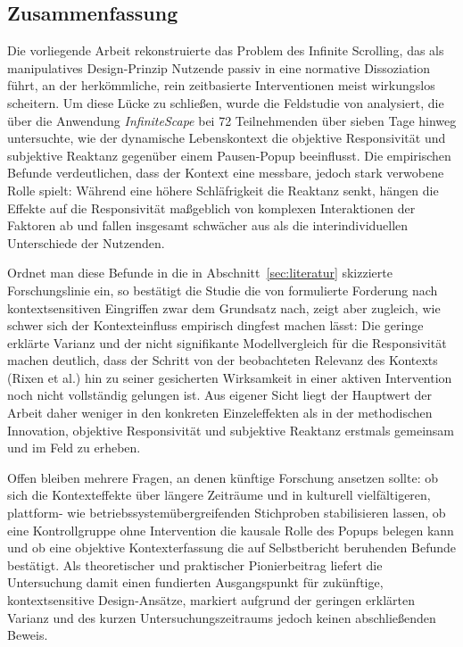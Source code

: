 \documentclass[11pt,a4paper]{article}
\begin{document}
\subsection{Zusammenfassung}

Die vorliegende Arbeit rekonstruierte das Problem des Infinite Scrolling, das als
manipulatives Design-Prinzip Nutzende passiv in eine normative Dissoziation führt, an der
herkömmliche, rein zeitbasierte Interventionen meist wirkungslos scheitern. Um diese Lücke
zu schließen, wurde die Feldstudie von \citet{meinhardt2025scrolling} analysiert, die über
die Anwendung \emph{InfiniteScape} bei 72 Teilnehmenden über sieben Tage hinweg
untersuchte, wie der dynamische Lebenskontext die objektive Responsivität und subjektive
Reaktanz gegenüber einem Pausen-Popup beeinflusst. Die empirischen Befunde verdeutlichen,
dass der Kontext eine messbare, jedoch stark verwobene Rolle spielt: Während eine höhere
Schläfrigkeit die Reaktanz senkt, hängen die Effekte auf die Responsivität maßgeblich von
komplexen Interaktionen der Faktoren ab und fallen insgesamt schwächer aus als die
interindividuellen Unterschiede der Nutzenden.

Ordnet man diese Befunde in die in Abschnitt~\ref{sec:literatur} skizzierte Forschungslinie
ein, so bestätigt die Studie die von \citet{rixen2023loop} formulierte Forderung nach
kontextsensitiven Eingriffen zwar dem Grundsatz nach, zeigt aber zugleich, wie schwer sich
der Kontexteinfluss empirisch dingfest machen lässt: Die geringe erklärte Varianz und der
nicht signifikante Modellvergleich für die Responsivität machen deutlich, dass der Schritt
von der beobachteten Relevanz des Kontexts (Rixen et al.) hin zu seiner gesicherten
Wirksamkeit in einer aktiven Intervention noch nicht vollständig gelungen ist. Aus eigener
Sicht liegt der Hauptwert der Arbeit daher weniger in den konkreten Einzeleffekten als in
der methodischen Innovation, objektive Responsivität und subjektive Reaktanz erstmals
gemeinsam und im Feld zu erheben.

Offen bleiben mehrere Fragen, an denen künftige Forschung ansetzen sollte: ob sich die
Kontexteffekte über längere Zeiträume und in kulturell vielfältigeren, plattform- wie
betriebssystemübergreifenden Stichproben stabilisieren lassen, ob eine Kontrollgruppe ohne
Intervention die kausale Rolle des Popups belegen kann und ob eine objektive
Kontexterfassung die auf Selbstbericht beruhenden Befunde bestätigt. Als theoretischer und
praktischer Pionierbeitrag liefert die Untersuchung damit einen fundierten Ausgangspunkt für
zukünftige, kontextsensitive Design-Ansätze, markiert aufgrund der geringen erklärten
Varianz und des kurzen Untersuchungszeitraums jedoch keinen abschließenden Beweis.

\clearpage



\end{document}
